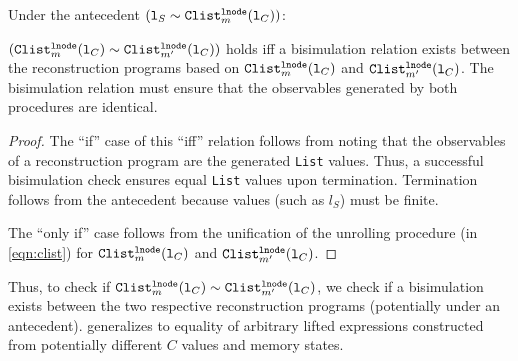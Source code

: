 \begin{theorem}\label{theorem:clistsEqual}
Under the antecedent
$({\tt l}_S \sim{} {\tt Clist}_m^{{\tt lnode}}({\tt l}_C))$:

$({\tt Clist}_m^{{\tt lnode}}({\tt l}_C)
\sim{}
{\tt Clist}_{m'}^{{\tt lnode}}({\tt l}_C))$
holds iff a bisimulation relation
exists between the reconstruction programs
based on ${\tt Clist}_m^{{\tt lnode}}({\tt l}_C)$
and
${\tt Clist}_{m'}^{{\tt lnode}}({\tt l}_C)$.
The bisimulation relation must ensure that the
observables generated by both procedures are
identical.
\end{theorem}
\begin{proof}\let\qed\relax
The ``if'' case of this ``iff'' relation follows
from noting that the observables of
a reconstruction program are the
generated {\tt List} values. Thus, a
successful bisimulation
check ensures equal
{\tt List}
values upon termination. Termination
follows from the antecedent because
\SpecL{} values (such as $l_S$) must be finite.

The ``only if'' case
follows from the unification of the
unrolling procedure (in \cref{eqn:clist}) for
${\tt Clist}_m^{{\tt lnode}}({\tt l}_C)$
and
${\tt Clist}_{m'}^{{\tt lnode}}({\tt l}_C)$.

\end{proof}

Thus, to check if ${\tt Clist}_m^{{\tt lnode}}({\tt l}_C)
\sim{} {\tt Clist}_{m'}^{{\tt lnode}}({\tt l}_C)$, we
check if a bisimulation exists
between the two respective reconstruction programs (potentially
under an antecedent).   generalizes
to equality of arbitrary lifted expressions constructed from potentially
different $C$ values and memory states.

